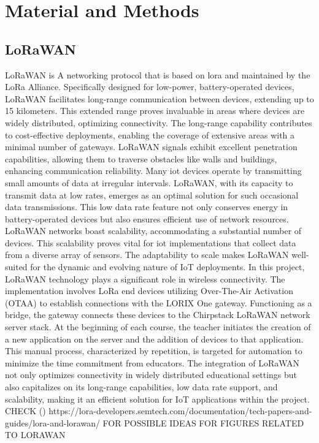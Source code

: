 
\chapter{Material and Methods} \label{ch:mat_met}
\section{LoRaWAN}
LoRaWAN is A networking protocol that is based on \gls{lora} and maintained by the LoRa Alliance.
Specifically designed for low-power, battery-operated devices, LoRaWAN facilitates long-range communication between devices, extending up to 15 kilometers.
This extended range proves invaluable in areas where devices are widely distributed, optimizing connectivity.
The long-range capability contributes to cost-effective deployments, enabling the coverage of extensive areas with a minimal number of gateways.
LoRaWAN signals exhibit excellent penetration capabilities, allowing them to traverse obstacles like walls and buildings, enhancing communication reliability.
Many \gls{iot} devices operate by transmitting small amounts of data at irregular intervals.
LoRaWAN, with its capacity to transmit data at low rates, emerges as an optimal solution for such occasional data transmissions.
This low data rate feature not only conserves energy in battery-operated devices but also ensures efficient use of network resources.
LoRaWAN networks boast scalability, accommodating a substantial number of devices.
This scalability proves vital for \gls{iot} implementations that collect data from a diverse array of sensors.
The adaptability to scale makes LoRaWAN well-suited for the dynamic and evolving nature of IoT deployments.
In this project, LoRaWAN technology plays a significant role in wireless connectivity.
The implementation involves LoRa end devices utilizing Over-The-Air Activation (OTAA) to establish connections with the LORIX One gateway.
Functioning as a bridge, the gateway connects these devices to the Chirpstack LoRaWAN network server stack.
At the beginning of each course, the teacher initiates the creation of a new application on the server and the addition of devices to that application.
This manual process, characterized by repetition, is targeted for automation to minimize the time commitment from educators.
The integration of LoRaWAN not only optimizes connectivity in widely distributed educational settings but also capitalizes on its long-range capabilities, low data rate support, and scalability, making it an efficient solution for IoT applications within the project.
\cite{lora-developer-portal:about}
CHECK  (\cite{}) https://lora-developers.semtech.com/documentation/tech-papers-and-guides/lora-and-lorawan/ FOR POSSIBLE IDEAS FOR FIGURES RELATED TO LORAWAN

